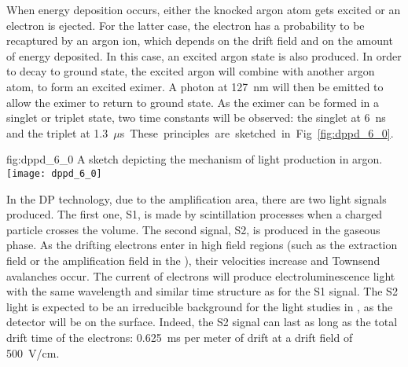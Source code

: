 When energy deposition occurs, either the knocked argon atom gets excited or an electron is ejected. For the latter case, the electron has a probability to be recaptured by an argon ion, which depends on the drift field and on the amount of energy deposited. In this case, an excited argon state is also produced. In order to decay to ground state, the excited argon will combine with another argon atom, to form an excited eximer. A photon at \SI{127}{nm} will then be emitted to allow the eximer to return to ground state. As the eximer can be formed in a singlet or triplet state, two time constants will be observed: the singlet at \SI{6}{ns}
and the triplet at \SI{1.3}{$\mu$s}. These principles are sketched in Fig.~\ref{fig:dppd_6_0}.

\begin{dunefigure}{fig:dppd_6_0}
{A sketch depicting the mechanism of light production in argon.}
\texttt{[image: dppd\_6\_0]}
\end{dunefigure}

In the DP technology, due to the amplification area, there are two light signals produced. The first one, S1, is made by scintillation processes when a charged particle crosses the \lar volume. The second signal, S2, is produced in the gaseous phase. As the drifting electrons enter in high field regions (such as the extraction field or the amplification field in the ), their velocities increase and Townsend avalanches occur. The current of electrons will produce electroluminescence light with the same wavelength and similar time structure as for the S1 signal. %
The S2 light is expected to be an irreducible background for the light studies in , as the detector will be on the surface. Indeed, the S2 signal can last as long as the total drift time of the electrons: \SI{0.625}{ms} per meter of drift at a drift field of \SI{500}{V/cm}.


